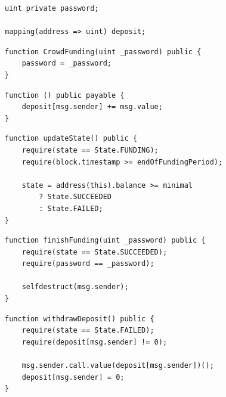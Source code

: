 \documentclass[xcolor=x11names,compress]{beamer}
\begin{document}
\begin{frame}[fragile]
\begin{overprint}
		\begin{minipage}[c][0.7\textheight][c]{\textwidth}
			\begin{verbatim}
uint private password;

mapping(address => uint) deposit;
    \end{verbatim}
		\end{minipage}
		\begin{minipage}[c][0.7\textheight][c]{\textwidth}
			\begin{verbatim}
function CrowdFunding(uint _password) public {
    password = _password;
}
	\end{verbatim}
		\end{minipage}

		\begin{minipage}[c][0.7\textheight][c]{\textwidth}
			\begin{verbatim}
function () public payable {
    deposit[msg.sender] += msg.value;
}
	\end{verbatim}
		\end{minipage}
		\begin{minipage}[c][0.7\textheight][c]{\textwidth}
			\begin{verbatim}
function updateState() public {
    require(state == State.FUNDING);
    require(block.timestamp >= endOfFundingPeriod);
    
    state = address(this).balance >= minimal
        ? State.SUCCEEDED
        : State.FAILED;
}
	\end{verbatim}
		\end{minipage}
		\begin{minipage}[c][0.7\textheight][c]{\textwidth}
			\begin{verbatim}
function finishFunding(uint _password) public {
    require(state == State.SUCCEEDED);
    require(password == _password);
    
    selfdestruct(msg.sender);
}
	\end{verbatim}
		\end{minipage}
		\begin{minipage}[c][0.7\textheight][c]{\textwidth}
			\begin{verbatim}
function withdrawDeposit() public {
    require(state == State.FAILED);
    require(deposit[msg.sender] != 0);
    
    msg.sender.call.value(deposit[msg.sender])();
    deposit[msg.sender] = 0;
}
	\end{verbatim}
		\end{minipage}
	\end{overprint}
\end{frame}
\egroup
\end{document}
